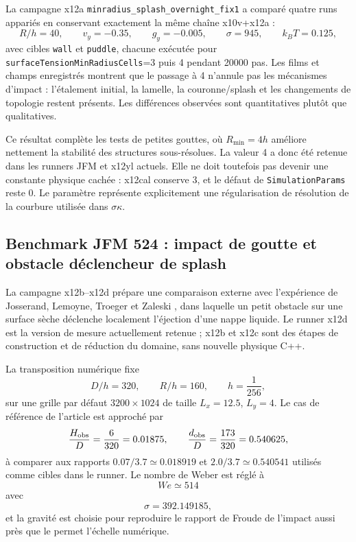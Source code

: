\documentclass[11pt,a4paper]{article}
\begin{document}
La campagne x12a \texttt{minradius\_splash\_overnight\_fix1} a comparé quatre runs appariés en conservant exactement la même chaîne x10v+x12a :
\begin{equation}
  R/h=40,\qquad
  v_y=-0.35,\qquad
  g_y=-0.005,\qquad
  \sigma=945,\qquad
  k_BT=0.125,
\end{equation}
avec cibles \texttt{wall} et \texttt{puddle}, chacune exécutée pour
\texttt{surfaceTensionMinRadiusCells}=3 puis 4 pendant 20000 pas. Les films et champs enregistrés montrent que le passage à 4 n'annule pas les mécanismes d'impact : l'étalement initial, la lamelle, la couronne/splash et les changements de topologie restent présents. Les différences observées sont quantitatives plutôt que qualitatives.

Ce résultat complète les tests de petites gouttes, où $R_{\min}=4h$ améliore nettement la stabilité des structures sous-résolues. La valeur 4 a donc été retenue dans les runners JFM et x12yl actuels. Elle ne doit toutefois pas devenir une constante physique cachée : x12cal conserve 3, et le défaut de \texttt{SimulationParams} reste 0. Le paramètre représente explicitement une régularisation de résolution de la courbure utilisée dans $\sigma\kappa$.

\subsection{Benchmark JFM 524 : impact de goutte et obstacle déclencheur de splash}

La campagne x12b--x12d prépare une comparaison externe avec l'expérience de Josserand, Lemoyne, Troeger et Zaleski \cite{JosserandLemoyneTroegerZaleski2005}, dans laquelle un petit obstacle sur une surface sèche déclenche localement l'éjection d'une nappe liquide. Le runner x12d est la version de mesure actuellement retenue ; x12b et x12c sont des étapes de construction et de réduction du domaine, sans nouvelle physique C++.

La transposition numérique fixe
\[
  D/h=320,\qquad
  R/h=160,\qquad
  h=\frac{1}{256},
\]
sur une grille par défaut $3200\times1024$ de taille $L_x=12.5$, $L_y=4$. Le cas de référence de l'article est approché par
\[
  \frac{H_{\rm obs}}{D}
  =\frac{6}{320}
  =0.01875,
  \qquad
  \frac{d_{\rm obs}}{D}
  =\frac{173}{320}
  =0.540625,
\]
à comparer aux rapports $0.07/3.7\simeq0.018919$ et $2.0/3.7\simeq0.540541$ utilisés comme cibles dans le runner. Le nombre de Weber est réglé à
\[
  We\simeq514
\]
avec
\[
  \sigma=392.149185,
\]
et la gravité est choisie pour reproduire le rapport de Froude de l'impact aussi près que le permet l'échelle numérique.
\end{document}
